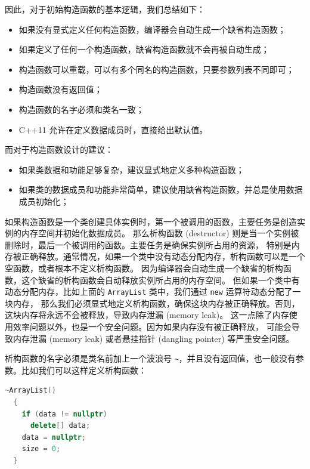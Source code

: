 \documentclass[a4paper]{ctexart}
\theoremstyle{definition}
\theoremstyle{definition}
\begin{document}
因此，对于初始构造函数的基本逻辑，我们总结如下：
\begin{itemize}
  \item 如果没有显式定义任何构造函数，编译器会自动生成一个缺省构造函数；
  \item 如果定义了任何一个构造函数，缺省构造函数就不会再被自动生成；
  \item 构造函数可以重载，可以有多个同名的构造函数，只要参数列表不同即可；
  \item 构造函数没有返回值；
  \item 构造函数的名字必须和类名一致；
  \item C++11 允许在定义数据成员时，直接给出默认值。
\end{itemize}
而对于构造函数设计的建议：
\begin{itemize}
  \item 如果类数据和功能足够复杂，建议显式地定义多种构造函数；
  \item 如果类的数据成员和功能非常简单，建议使用缺省构造函数，并总是使用数据成员初始化；
\end{itemize}


如果构造函数是一个类创建具体实例时，第一个被调用的函数，主要任务是创造实例的内存空间并初始化数据成员。
那么析构函数 (destructor) 则是当一个实例被删除时，最后一个被调用的函数。主要任务是确保实例所占用的资源，
特别是内存被正确释放。通常情况，如果一个类中没有动态分配内存，析构函数可以是一个空函数，或者根本不定义析构函数。
因为编译器会自动生成一个缺省的析构函数，这个缺省的析构函数会自动释放实例所占用的内存空间。
但如果一个类中有动态分配内存，比如上面的 \verb|ArrayList| 类中，我们通过 \verb|new| 运算符动态分配了一块内存，
那么我们必须显式地定义析构函数，确保这块内存被正确释放。否则，这块内存将永远不会被释放，导致内存泄漏 (memory leak)。
这一点除了内存使用效率问题以外，也是一个安全问题。因为如果内存没有被正确释放，
可能会导致内存泄漏 (memory leak) 或者悬挂指针 (dangling pointer) 等严重安全问题。

析构函数的名字必须是类名前加上一个波浪号 \verb|~|，并且没有返回值，也一般没有参数。比如我们可以这样定义析构函数：
\begin{lstlisting}[language=C++]
  ~ArrayList()
  {
    if (data != nullptr)
      delete[] data;
    data = nullptr;
    size = 0;
  }
\end{lstlisting}
\end{document}
